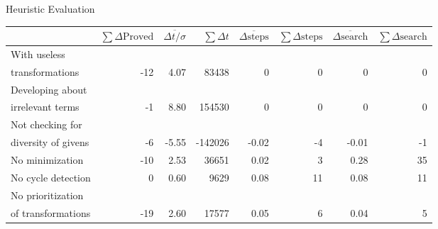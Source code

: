 \begin{frame}{Heuristic Evaluation}
	\tiny
	\begin{tabular}{lrrrrrrr}
		\toprule
			& $\sum \Delta\text{Proved}$	& $\overline{\Delta t / \sigma}$	& $\sum\Delta t$ & $\overline{\Delta\text{steps}}$ & $\sum\Delta\text{steps}$ & $\overline{\Delta\text{search}}$ & $\sum\Delta\text{search}$ \\
		\midrule
		With useless \\
		transformations		& -12	& 4.07	& 83438		& 0	& 0	& 0	& 0	\\
		\midrule
		Developing about \\
		irrelevant terms	& -1	& 8.80	& 154530	& 0	& 0	& 0	& 0\\
		\midrule
		Not checking for \\
		diversity of givens	& -6	& -5.55	& -142026	& -0.02	& -4	& -0.01	& -1	\\
		\midrule
		No minimization		& -10	& 2.53	& 36651		& 0.02	& 3	& 0.28	& 35	\\
		\midrule
		No cycle detection	& 0	& 0.60	& 9629		& 0.08	& 11	& 0.08	& 11	\\
		\midrule
		No prioritization \\
		of transformations	& -19	& 2.60	& 17577		& 0.05	& 6	& 0.04	& 5	\\
		\bottomrule
	\end{tabular}
\end{frame}
